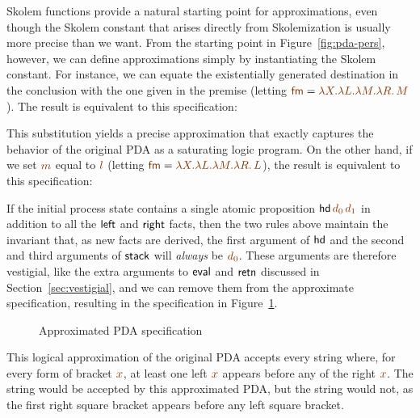 Skolem functions provide a natural starting point for approximations,
even though the Skolem constant that arises directly from
Skolemization is usually more precise than we want. From the starting
point in Figure~\ref{fig:pda-pers}, however, we can define
approximations simply by instantiating the Skolem constant.  For
instance, we can equate the existentially generated destination in the
conclusion with the one given in the premise (letting $\lf{\sf fm} =
\lf{\lambda X. \lambda L. \lambda M. \lambda R.\, M}$). The result is
equivalent to this specification:

\smallskip
{}
\smallskip

\noindent This substitution yields a precise approximation
that exactly captures the behavior of the original PDA as a saturating
logic program. On the other hand, if we set $\lf{m}$ equal to $\lf{l}$ 
(letting $\lf{\sf fm} = \lf{\lambda X. \lambda L. \lambda M. \lambda R.\, L}$), 
the result is equivalent to this specification:

\smallskip
{}
\smallskip


If the initial process state contains a single atomic proposition
${\sf hd}\,\lf{d_0}\,\lf{d_1}$ in addition to all the ${\sf left}$ and ${\sf
  right}$ facts, then the two rules above maintain the invariant that,
as new facts are derived, the first argument of ${\sf hd}$ and the
second and third arguments of ${\sf stack}$ will {\it always} be
$\lf{d_0}$.  These arguments are therefore vestigial, like the extra
arguments to ${\sf eval}$ and ${\sf retn}$ discussed in
Section~\ref{sec:vestigial}, and we can remove them from the
approximate specification, resulting in the specification in
Figure~\ref{fig:pda-pers-approx2}. 

\begin{figure}[ht]
\caption{Approximated PDA specification}
\label{fig:pda-pers-approx2}
\end{figure}

This logical approximation of the
original PDA accepts every string where, for every form of bracket
$\lf{x}$, at least one left $\lf{x}$ appears before any of the right 
$\lf{x}$. The
string \obj{\mbox{\sf [ ] ] ] ( ( )}} 
would be accepted by this approximated PDA,
but the string \obj{\mbox{\sf ( ) ] [ [ ]}} 
would not, as the first right square
bracket appears before any left square bracket.



